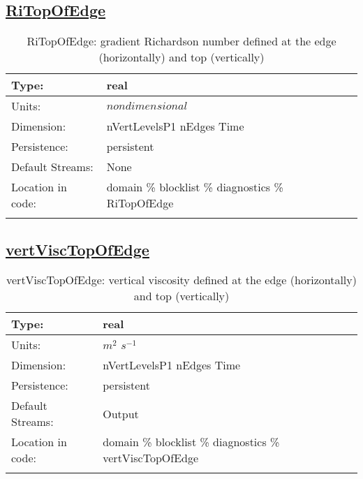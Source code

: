 \subsection[RiTopOfEdge]{\hyperref[sec:var_tab_diagnostics]{RiTopOfEdge}}
\label{subsec:var_sec_diagnostics_RiTopOfEdge}
\begin{center}
\begin{longtable}{| p{2.0in} | p{4.0in} |}
        \hline 
        Type: & real \\
        \hline 
        Units: & $nondimensional$ \\
        \hline 
        Dimension: & nVertLevelsP1 nEdges Time \\
        \hline 
        Persistence: & persistent \\
        \hline 
		 Default Streams: & None \\
        \hline 
		 Location in code: & domain \% blocklist \% diagnostics \% RiTopOfEdge \\
		 \hline 
    \caption{RiTopOfEdge: gradient Richardson number defined at the edge (horizontally) and top (vertically)}
\end{longtable}
\end{center}
\subsection[vertViscTopOfEdge]{\hyperref[sec:var_tab_diagnostics]{vertViscTopOfEdge}}
\label{subsec:var_sec_diagnostics_vertViscTopOfEdge}
\begin{center}
\begin{longtable}{| p{2.0in} | p{4.0in} |}
        \hline 
        Type: & real \\
        \hline 
        Units: & $m^2$ $s^{-1}$ \\
        \hline 
        Dimension: & nVertLevelsP1 nEdges Time \\
        \hline 
        Persistence: & persistent \\
        \hline 
		 Default Streams: & Output  \\
        \hline 
		 Location in code: & domain \% blocklist \% diagnostics \% vertViscTopOfEdge \\
		 \hline 
    \caption{vertViscTopOfEdge: vertical viscosity defined at the edge (horizontally) and top (vertically)}
\end{longtable}
\end{center}
